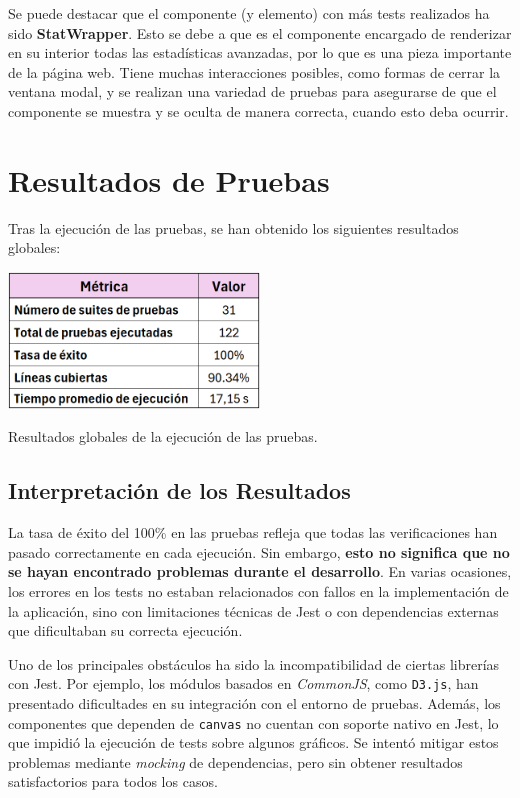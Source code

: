 Se puede destacar que el componente (y elemento) con más tests realizados ha sido \textbf{StatWrapper}. Esto se debe a que es el componente encargado de renderizar en su interior todas las estadísticas avanzadas, por lo que es una pieza importante de la página web. Tiene muchas interacciones posibles, como formas de cerrar la ventana modal, y se realizan una variedad de pruebas para asegurarse de que el componente se muestra y se oculta de manera correcta, cuando esto deba ocurrir.

\newpage

\section{Resultados de Pruebas}

Tras la ejecución de las pruebas, se han obtenido los siguientes resultados globales:

\begin{table}[H]
    \centering
    \includegraphics[width=0.5\textwidth]{figures/resultado_tests.png}
    \captionsetup{skip=7pt}
    \caption{Resultados globales de la ejecución de las pruebas.}
    \label{tab:resultado_tests}
\end{table}

\subsection{Interpretación de los Resultados}

La tasa de éxito del 100\% en las pruebas refleja que todas las verificaciones han pasado correctamente en cada ejecución. Sin embargo, \textbf{esto no significa que no se hayan encontrado problemas durante el desarrollo}. En varias ocasiones, los errores en los tests no estaban relacionados con fallos en la implementación de la aplicación, sino con limitaciones técnicas de Jest o con dependencias externas que dificultaban su correcta ejecución.

Uno de los principales obstáculos ha sido la incompatibilidad de ciertas librerías con Jest. Por ejemplo, los módulos basados en \textit{CommonJS}, como \texttt{D3.js}, han presentado dificultades en su integración con el entorno de pruebas. Además, los componentes que dependen de \texttt{canvas} no cuentan con soporte nativo en Jest, lo que impidió la ejecución de tests sobre algunos gráficos. Se intentó mitigar estos problemas mediante \textit{mocking} de dependencias, pero sin obtener resultados satisfactorios para todos los casos.

